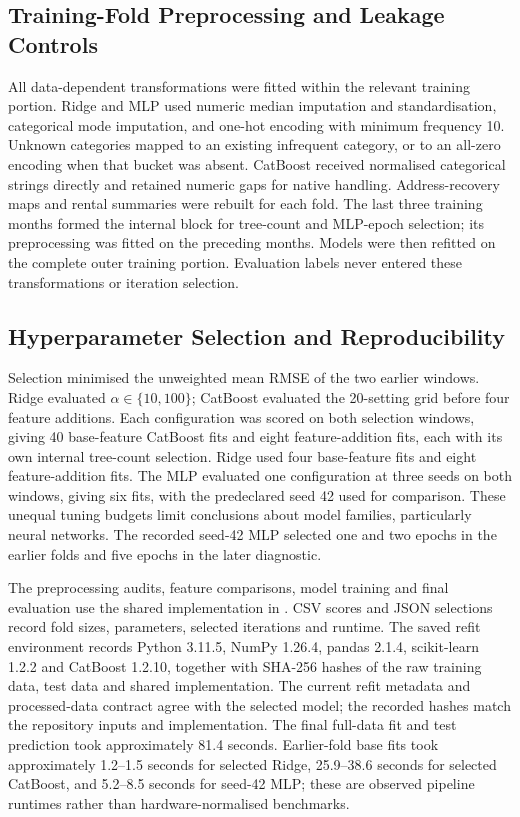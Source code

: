 \documentclass[conference]{IEEEtran}
\newcommand{\field}[1]{\texttt{\detokenize{#1}}}
\begin{document}
\subsection{Training-Fold Preprocessing and Leakage Controls}
All data-dependent transformations were fitted within the relevant training
portion. Ridge and MLP used numeric median imputation and standardisation,
categorical mode imputation, and one-hot encoding with minimum frequency 10.
Unknown categories mapped to an existing infrequent category, or to an
all-zero encoding when that bucket was absent. CatBoost received normalised
categorical strings directly and retained numeric gaps for native handling.
Address-recovery maps and rental summaries were rebuilt for each fold.
The last three training months formed the internal block for tree-count
and MLP-epoch selection; its preprocessing was fitted on the preceding
months. Models were then refitted on the complete outer training portion.
Evaluation labels never entered these transformations or iteration selection.

\subsection{Hyperparameter Selection and Reproducibility}
Selection minimised the unweighted mean RMSE of the two earlier windows.
Ridge evaluated $\alpha\in\{10,100\}$; CatBoost evaluated the 20-setting grid
before four feature additions. Each configuration was scored on both
selection windows, giving 40 base-feature CatBoost fits and eight
feature-addition fits, each with its own internal tree-count selection.
Ridge used four base-feature fits and eight feature-addition fits. The MLP
evaluated one configuration at three seeds on both windows, giving six
fits, with the predeclared seed 42 used for comparison. These unequal tuning
budgets limit conclusions about model families, particularly neural networks.
The recorded seed-42 MLP selected one and two epochs in the earlier folds
and five epochs in the later diagnostic.

The preprocessing audits, feature comparisons, model training and final
evaluation use the shared implementation in
\field{experiments/rental_experiments.py}. CSV scores and JSON selections
record fold sizes, parameters, selected iterations and runtime. The saved
refit environment records Python 3.11.5, NumPy 1.26.4, pandas 2.1.4,
scikit-learn 1.2.2 and CatBoost 1.2.10, together with SHA-256 hashes of the
raw training data, test data and shared implementation. The current refit
metadata and processed-data contract agree with the selected model;
the recorded hashes match the repository inputs and implementation.
The final full-data fit and test prediction took approximately 81.4 seconds.
Earlier-fold base
fits took approximately 1.2--1.5 seconds for selected Ridge, 25.9--38.6
seconds for selected CatBoost, and 5.2--8.5 seconds for seed-42 MLP;
these are observed pipeline runtimes rather than hardware-normalised benchmarks.
\end{document}
